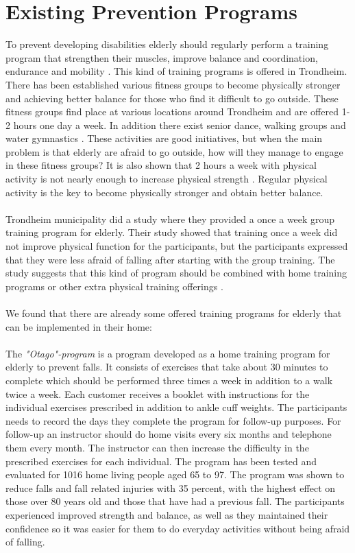 \section{Existing Prevention Programs}
To prevent developing disabilities elderly should regularly perform a training program that strengthen their muscles, improve balance and coordination, endurance and mobility \cite{gruppetrening-trheim}. This kind of training programs is offered in Trondheim. There has been established various fitness groups to become physically stronger and achieving better balance for those who find it difficult to go outside. These fitness groups find place at various locations around Trondheim and are offered 1-2 hours one day a week. In addition there exist senior dance, walking groups and water gymnastics \cite{trim}. These activities are good initiatives, but when the main problem is that elderly are afraid to go outside, how will they manage to engage in these fitness groups? It is also shown that 2 hours a week with physical activity is not nearly enough to increase physical strength \cite{gruppetrening-trheim}. Regular physical activity is the key to become physically stronger and obtain better balance. \\ \\
Trondheim municipality did a study where they provided a once a week group training program for elderly. Their study showed that training once a week did not improve physical function for the participants, but the participants expressed that they were less afraid of falling after starting with the group training. The study suggests that this kind of program should be combined with home training programs or other extra physical training offerings \cite{gruppetrening-trheim}. \\ \\
We found that there are already some offered training programs for elderly that can be implemented in their home:\\ \\
The \emph{"Otago"-program} is a program developed as a home training program for elderly to prevent falls. It consists of exercises that take about 30 minutes to complete which should be performed three times a week in addition to a walk twice a week. Each customer receives a booklet with instructions for the individual exercises prescribed in addition to ankle cuff weights. The participants needs to record the days they complete the program for follow-up purposes. For follow-up an instructor should do home visits every six months and telephone them every month. The instructor can then increase the difficulty in the prescribed exercises for each individual. The program has been tested and evaluated for 1016 home living people aged 65 to 97. The program was shown to reduce falls and fall related injuries with 35 percent, with the highest effect on those over 80 years old and those that have had a previous fall. The participants experienced improved strength and balance, as well as they maintained their confidence so it was easier for them to do everyday activities without being afraid of falling. \cite{otago} \cite{gruppetrening-trheim}\\ \\
